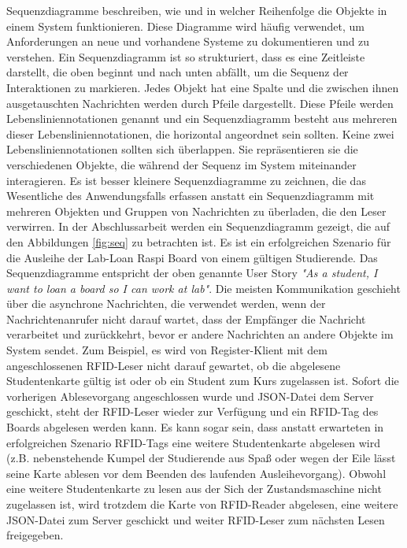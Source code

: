 Sequenzdiagramme beschreiben, wie und in welcher Reihenfolge die Objekte in einem System funktionieren. Diese Diagramme wird häufig verwendet, um Anforderungen an neue und vorhandene Systeme zu dokumentieren und zu verstehen. Ein Sequenzdiagramm ist so strukturiert, dass es eine Zeitleiste darstellt, die oben beginnt und nach unten abfällt, um die Sequenz der Interaktionen zu markieren. Jedes Objekt hat eine Spalte und die zwischen ihnen ausgetauschten Nachrichten werden durch Pfeile dargestellt. Diese Pfeile werden Lebensliniennotationen genannt und ein Sequenzdiagramm besteht aus mehreren dieser Lebensliniennotationen, die horizontal angeordnet sein sollten. Keine zwei Lebensliniennotationen sollten sich überlappen. Sie repräsentieren sie die verschiedenen Objekte, die während der Sequenz im System miteinander interagieren. Es ist besser kleinere Sequenzdiagramme zu zeichnen, die das Wesentliche des Anwendungsfalls erfassen
anstatt ein Sequenzdiagramm mit mehreren Objekten und Gruppen von Nachrichten zu überladen, die den Leser verwirren. In der Abschlussarbeit werden ein Sequenzdiagramm gezeigt, die auf den Abbildungen \ref{fig:seq} zu betrachten ist. Es ist ein erfolgreichen Szenario für die Ausleihe der Lab-Loan Raspi Board von einem gültigen Studierende. Das Sequenzdiagramme entspricht der oben genannte User Story \textit{"As a student, I want to loan a board so I can work at lab"}. Die meisten Kommunikation geschieht über die asynchrone Nachrichten, die verwendet werden, wenn der Nachrichtenanrufer nicht darauf wartet, dass der Empfänger die Nachricht verarbeitet und zurückkehrt, bevor er andere Nachrichten an andere Objekte im System sendet. Zum Beispiel, es wird von Register-Klient mit dem angeschlossenen RFID-Leser nicht darauf gewartet, ob die abgelesene Studentenkarte gültig ist oder ob ein Student zum Kurs zugelassen ist. Sofort die vorherigen Ablesevorgang angeschlossen wurde und JSON-Datei dem Server geschickt, steht der RFID-Leser wieder zur Verfügung und ein RFID-Tag des Boards abgelesen werden kann. Es kann sogar sein, dass anstatt erwarteten in erfolgreichen Szenario RFID-Tags eine weitere Studentenkarte abgelesen wird (z.B. nebenstehende Kumpel der Studierende aus Spaß oder wegen der Eile lässt seine Karte ablesen vor dem Beenden des laufenden Ausleihevorgang). Obwohl eine weitere Studentenkarte zu lesen aus der Sich der Zustandsmaschine nicht zugelassen ist, wird trotzdem die Karte von RFID-Reader abgelesen, eine weitere JSON-Datei zum Server geschickt und weiter RFID-Leser zum nächsten Lesen freigegeben. 


